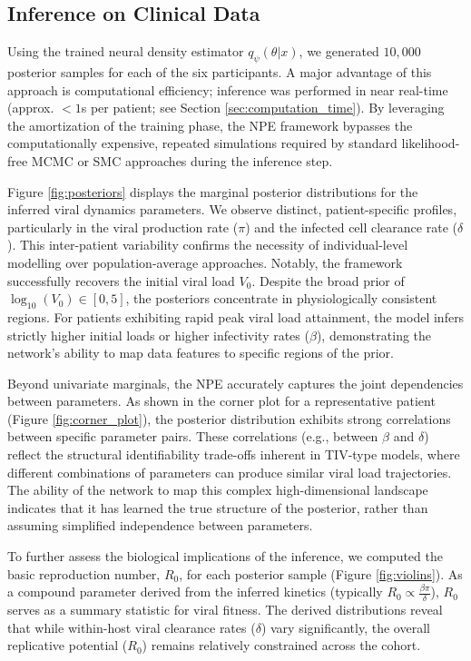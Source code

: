 \documentclass{article}
\begin{document}
\subsection{Inference on Clinical Data}
Using the trained neural density estimator $q_\psi(\theta | x)$, we generated $10,000$ posterior samples for each of the six participants. A major advantage of this approach is computational efficiency; inference was performed in near real-time (approx. $<1$s per patient; see Section \ref{sec:computation_time}). By leveraging the amortization of the training phase, the NPE framework bypasses the computationally expensive, repeated simulations required by standard likelihood-free MCMC or SMC approaches during the inference step.

Figure \ref{fig:posteriors} displays the marginal posterior distributions for the inferred viral dynamics parameters. We observe distinct, patient-specific profiles, particularly in the viral production rate ($\pi$) and the infected cell clearance rate ($\delta$). This inter-patient variability confirms the necessity of individual-level modelling over population-average approaches. Notably, the framework successfully recovers the initial viral load $V_0$. Despite the broad prior of $\log_{10}(V_0) \in [0, 5]$, the posteriors concentrate in physiologically consistent regions. For patients exhibiting rapid peak viral load attainment, the model infers strictly higher initial loads or higher infectivity rates ($\beta$), demonstrating the network's ability to map data features to specific regions of the prior.

Beyond univariate marginals, the NPE accurately captures the joint dependencies between parameters. As shown in the corner plot for a representative patient (Figure \ref{fig:corner_plot}), the posterior distribution exhibits strong correlations between specific parameter pairs. These correlations (e.g., between $\beta$ and $\delta$) reflect the structural identifiability trade-offs inherent in TIV-type models, where different combinations of parameters can produce similar viral load trajectories. The ability of the network to map this complex high-dimensional landscape indicates that it has learned the true structure of the posterior, rather than assuming simplified independence between parameters.

To further assess the biological implications of the inference, we computed the basic reproduction number, $R_0$, for each posterior sample (Figure \ref{fig:violins}). As a compound parameter derived from the inferred kinetics (typically $R_0 \propto \frac{\beta \pi}{\delta}$), $R_0$ serves as a summary statistic for viral fitness. The derived distributions reveal that while within-host viral clearance rates ($\delta$) vary significantly, the overall replicative potential ($R_0$) remains relatively constrained across the cohort.
\end{document}
